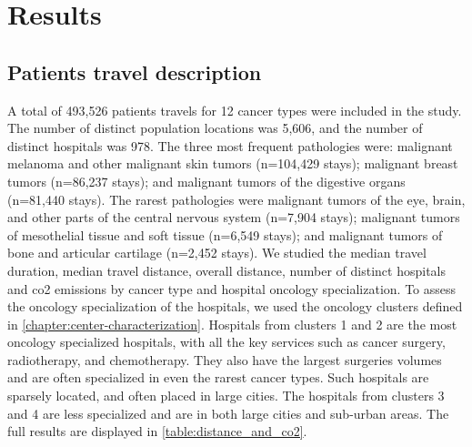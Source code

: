 \section{Results}

\subsection{Patients travel description}

A total of 493,526 patients travels for 12 cancer types were included in the
study. The number of distinct population locations was 5,606, and the number of
distinct hospitals was 978. The three most frequent pathologies were: malignant
melanoma and other malignant skin tumors (n=104,429 stays); malignant breast
tumors (n=86,237 stays); and malignant tumors of the digestive organs (n=81,440
stays). The rarest pathologies were malignant tumors of the eye, brain, and
other parts of the central nervous system (n=7,904 stays); malignant tumors of
mesothelial tissue and soft tissue (n=6,549 stays); and malignant tumors of bone
and articular cartilage (n=2,452 stays). We studied the median travel duration,
median travel distance, overall distance, number of distinct hospitals and
\ac{co2} emissions by cancer type and hospital oncology specialization. To
assess the oncology specialization of the hospitals, we used the oncology
clusters defined in \cref{chapter:center-characterization}. Hospitals from
clusters 1 and 2 are the most oncology specialized hospitals, with all the key
services such as cancer surgery, radiotherapy, and chemotherapy. They also have
the largest surgeries volumes and are often specialized in even the rarest
cancer types. Such hospitals are sparsely located, and often placed in large
cities. The hospitals from clusters 3 and 4 are less specialized and are in both
large cities and sub-urban areas. The full results are displayed in
\cref{table:distance_and_co2}.

